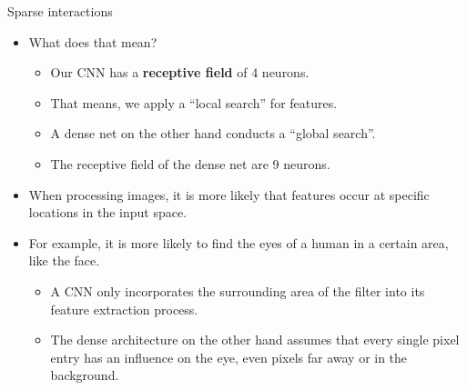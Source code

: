 \documentclass[11pt,compress,t,notes=noshow]{beamer}
\begin{document}
\begin{frame}{Sparse interactions}
  \begin{itemize}
    \item What does that mean?
    \begin{itemize}
      \item Our CNN has a \textbf{receptive field} of 4 neurons.
      \item That means, we apply a \enquote{local search} for features.
      \item A dense net on the other hand conducts a \enquote{global search}.
      \item The receptive field of the dense net are 9 neurons.
    \end{itemize}
    \item When processing images, it is more likely that features occur at specific locations in the input space.
    \item For example, it is more likely to find the eyes of a human in a certain area, like the face.
    \begin{itemize}
      \item A CNN only incorporates the surrounding area of the filter into its feature extraction process.
      \item The dense architecture on the other hand assumes that every single pixel entry has an influence on the eye, even pixels far away or in the background.
    \end{itemize}
  \end{itemize}
\end{frame}
\end{document}
